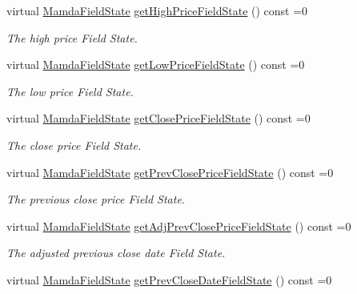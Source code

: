 \begin{CompactItemize}
virtual \hyperlink{namespaceWombat_93aac974f2ab713554fd12a1fa3b7d2a}{Mamda\-Field\-State} \hyperlink{classWombat_1_1MamdaTradeRecap_a96180881510aca5fb838905052fffa5}{get\-High\-Price\-Field\-State} () const =0
\begin{CompactList}\small\item\em The high price Field State. \item\end{CompactList}\item 
virtual \hyperlink{namespaceWombat_93aac974f2ab713554fd12a1fa3b7d2a}{Mamda\-Field\-State} \hyperlink{classWombat_1_1MamdaTradeRecap_db9836665c7f6b15c26f379ab680c374}{get\-Low\-Price\-Field\-State} () const =0
\begin{CompactList}\small\item\em The low price Field State. \item\end{CompactList}\item 
virtual \hyperlink{namespaceWombat_93aac974f2ab713554fd12a1fa3b7d2a}{Mamda\-Field\-State} \hyperlink{classWombat_1_1MamdaTradeRecap_a45cdea8950502d698ccdbd052b456c1}{get\-Close\-Price\-Field\-State} () const =0
\begin{CompactList}\small\item\em The close price Field State. \item\end{CompactList}\item 
virtual \hyperlink{namespaceWombat_93aac974f2ab713554fd12a1fa3b7d2a}{Mamda\-Field\-State} \hyperlink{classWombat_1_1MamdaTradeRecap_59c935c0a3b018e48fd9b1bb476cd4b7}{get\-Prev\-Close\-Price\-Field\-State} () const =0
\begin{CompactList}\small\item\em The previous close price Field State. \item\end{CompactList}\item 
virtual \hyperlink{namespaceWombat_93aac974f2ab713554fd12a1fa3b7d2a}{Mamda\-Field\-State} \hyperlink{classWombat_1_1MamdaTradeRecap_c19498f35c75d790cbfa74fc249824eb}{get\-Adj\-Prev\-Close\-Price\-Field\-State} () const =0
\begin{CompactList}\small\item\em The adjusted previous close date Field State. \item\end{CompactList}\item 
virtual \hyperlink{namespaceWombat_93aac974f2ab713554fd12a1fa3b7d2a}{Mamda\-Field\-State} \hyperlink{classWombat_1_1MamdaTradeRecap_33ca111d0e9e5b1bbe9e5c3ccd3d4c8c}{get\-Prev\-Close\-Date\-Field\-State} () const =0

\end{CompactItemize}
